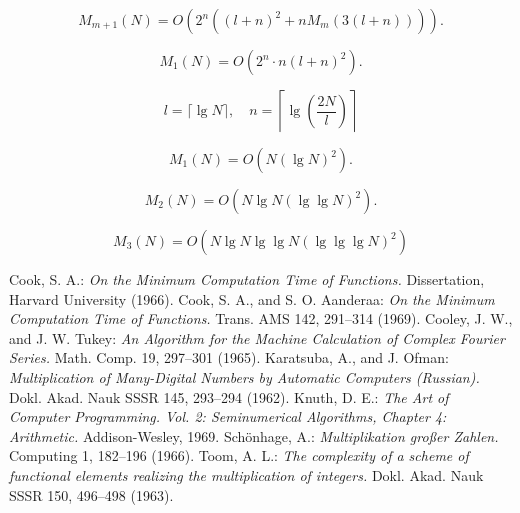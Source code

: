 \documentclass{article}
\begin{document}
\[
\tag{3.10}
M_{m + 1}(N) = O(2^n((l + n)^2 + nM_m(3(l + n)))).
\]

\[
M_1(N) = O(2^n \cdot n(l + n)^2).
\]

\[
l = \lceil \lg N \rceil, \quad n = \left\lceil \lg\left(\frac{2N}{l}\right)\right\rceil
\]

\[
\tag{3.11}
M_1(N) = O(N (\lg N)^2).
\]

\[
M_2(N) = O(N \lg N (\lg \lg N)^2).
\]

\[
M_3(N) = O(N \lg N \lg \lg N (\lg \lg \lg N)^2)
\]

\begin{thebibliography}{99}
 Cook, S. A.: \textit{On the Minimum Computation Time of Functions.} Dissertation, Harvard University (1966).
 Cook, S. A., and S. O. Aanderaa: \textit{On the Minimum Computation Time of Functions.} Trans. AMS 142, 291--314 (1969).
 Cooley, J. W., and J. W. Tukey: \textit{An Algorithm for the Machine Calculation of Complex Fourier Series.} Math. Comp. 19, 297--301 (1965).
 Karatsuba, A., and J. Ofman: \textit{Multiplication of Many-Digital Numbers by Automatic Computers (Russian).} Dokl. Akad. Nauk SSSR 145, 293--294 (1962).
 Knuth, D. E.: \textit{The Art of Computer Programming. Vol. 2: Seminumerical Algorithms, Chapter 4: Arithmetic.} Addison-Wesley, 1969.
 Schönhage, A.: \textit{Multiplikation großer Zahlen.} Computing 1, 182--196 (1966).
 Toom, A. L.: \textit{The complexity of a scheme of functional elements realizing the multiplication of integers.} Dokl. Akad. Nauk SSSR 150, 496--498 (1963).
\end{thebibliography}
\end{document}
